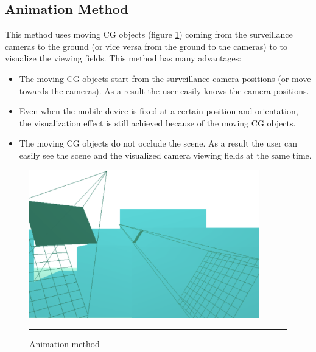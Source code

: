 \subsection{Animation Method}

This method uses moving CG objects (figure \ref{fig:AnimationMethod}) coming from the surveillance cameras to the ground (or vice versa from the ground to the cameras) to to visualize the viewing fields. This method has  many advantages:

\begin{itemize}
	\item The moving CG objects start from the surveillance camera positions (or move towards the cameras). As a result the user easily knows the camera positions.
	\item Even when the mobile device is fixed at a certain position and orientation, the visualization effect is still achieved because of the moving CG objects.
	\item The moving CG objects do not occlude the scene. As a result the user can easily see the scene and the visualized camera viewing fields at the same time.
\end{itemize}

\begin{figure}[htbp]
	\centering
	\includegraphics[width=10cm]{./Primitives/theory_animation.png}
	\rule{35em}{0.5pt}
	\caption[Animation method]{Animation method}
	\label{fig:AnimationMethod}
\end{figure}
